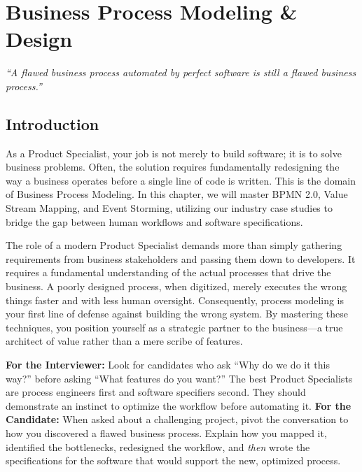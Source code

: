 \documentclass[
  11pt,
  openany,
  oneside]{book}
\renewenvironment{quote}{\begin{customquote}}{\end{customquote}}
\begin{document}
\chapter{Business Process Modeling \&
Design}\label{business-process-modeling-design}

\begin{quote}
\emph{``A flawed business process automated by perfect software is still
a flawed business process.''}
\end{quote}

\section{Introduction}\label{introduction-1}

As a Product Specialist, your job is not merely to build software; it is
to solve business problems. Often, the solution requires fundamentally
redesigning the way a business operates before a single line of code is
written. This is the domain of Business Process Modeling. In this
chapter, we will master BPMN 2.0, Value Stream Mapping, and Event
Storming, utilizing our industry case studies to bridge the gap between
human workflows and software specifications.

The role of a modern Product Specialist demands more than simply
gathering requirements from business stakeholders and passing them down
to developers. It requires a fundamental understanding of the actual
processes that drive the business. A poorly designed process, when
digitized, merely executes the wrong things faster and with less human
oversight. Consequently, process modeling is your first line of defense
against building the wrong system. By mastering these techniques, you
position yourself as a strategic partner to the business---a true
architect of value rather than a mere scribe of features.

\begin{quote}
\textbf{For the Interviewer:} Look for candidates who ask ``Why do we do
it this way?'' before asking ``What features do you want?'' The best
Product Specialists are process engineers first and software specifiers
second. They should demonstrate an instinct to optimize the workflow
before automating it. \textbf{For the Candidate:} When asked about a
challenging project, pivot the conversation to how you discovered a
flawed business process. Explain how you mapped it, identified the
bottlenecks, redesigned the workflow, and \emph{then} wrote the
specifications for the software that would support the new, optimized
process.
\end{quote}
\end{document}
